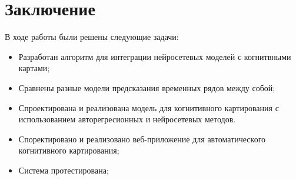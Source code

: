 \chapter*{Заключение}


В ходе работы были решены следующие задачи:

\begin{itemize}
	\item Разработан алгоритм для интеграции нейросетевых моделей с когнитвными картами;
	\item Сравнены разные модели предсказания временных рядов между собой;
	\item Спроектирована и реализована модель для когнитивного картирования с использованием
	авторегресионных и нейросетевых методов.
	\item Споректировано и реализовано веб-приложение для автоматического когнитивного картирования;
	\item Система протестирована;
\end{itemize}




